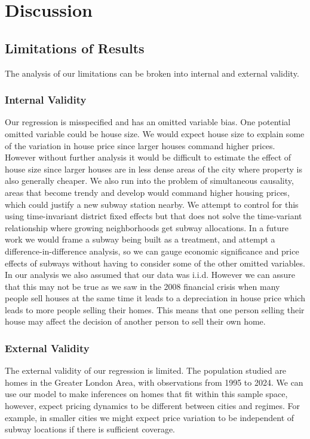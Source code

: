 \section{Discussion}
\label{sec:conclusion}
\subsection{Limitations of Results}
The analysis of our limitations can be broken into internal and external validity.

\subsubsection{Internal Validity}
 Our regression is misspecified and has an omitted variable bias.
  One potential omitted variable could be house size.
   We would expect house size to explain some of the variation in house price since larger houses command higher prices.
    However without further analysis it would be difficult to estimate the effect of house size since larger houses are in less dense areas of the city where property is also generally cheaper.
     We also run into the problem of simultaneous causality, areas that become trendy and develop would command higher housing prices, 
     which could justify a new subway station nearby. We attempt to control for this using time-invariant district fixed effects 
     but that does not solve the time-variant relationship where growing neighborhoods get subway allocations.
      In a future work we would frame a subway being built as a treatment, and attempt a difference-in-difference analysis, 
      so we can gauge economic significance and price effects of subways without having to consider some of the other omitted variables.
In our analysis we also assumed that our data was i.i.d. However we can assure that this may not be true as we 
saw in the 2008 financial crisis when many people sell houses at the same time it leads to a depreciation in 
house price which leads to more people selling their homes. This means that one person selling their house may 
affect the decision of another person to sell their own home.

\subsubsection{External Validity}
The external validity of our regression is limited. The population studied are homes in the Greater London Area, 
with observations from 1995 to 2024. We can use our model to make inferences on homes that fit within this sample space, 
however, expect pricing dynamics to be different between cities and regimes. For example, in smaller cities we might expect 
price variation to be independent of subway locations if there is sufficient coverage.


